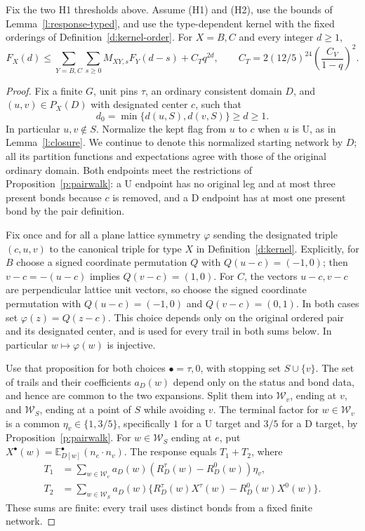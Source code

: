 \begin{lemma}\label{l:recineq}
Fix the two H1 thresholds above. Assume (H1) and (H2), use
the bounds of Lemma~\ref{l:response-typed}, and use the
type-dependent kernel with the fixed orderings of
Definition~\ref{d:kernel-order}.
For \(X=B,C\) and every integer \(d\ge1\),
\[
 F_X(d)\le\sum_{Y=B,C}\sum_{s\ge0}M_{XY,s}F_Y(d-s)+C_Tq^{2d},
 \qquad
 C_T=2(12/5)^{24}\left(\frac{C_V}{1-q}\right)^2 .
\]
\end{lemma}

\begin{proof}
Fix a finite \(G\), unit pins \(\tau\), an ordinary consistent
domain \(D\), and \((u,v)\in P_X(D)\) with designated center
\(c\), such that
\[
 d_0=\min\{d(u,S),d(v,S)\}\ge d\ge1.
\]
In particular \(u,v\notin S\).  Normalize the kept flag from
\(u\) to \(c\) when \(u\) is \(\mathrm U\), as in
Lemma~\ref{l:closure}.  We continue to denote this normalized
starting network by \(D\); all its partition functions and
expectations agree with those of the original ordinary domain.
Both endpoints meet the restrictions of Proposition~\ref{p:pairwalk}:
a \(\mathrm U\) endpoint has no original leg and at most three
present bonds because \(c\) is removed, and a \(\mathrm D\)
endpoint has at most one present bond by the pair definition.

Fix once and for all a plane lattice symmetry \(\varphi\) sending
the designated triple \((c,u,v)\) to the canonical triple for
type \(X\) in Definition~\ref{d:kernel}.  Explicitly, for \(B\)
choose a signed coordinate permutation \(Q\) with
\(Q(u-c)=(-1,0)\); then \(v-c=-(u-c)\) implies
\(Q(v-c)=(1,0)\).  For \(C\), the vectors \(u-c,v-c\) are
perpendicular lattice unit vectors, so choose the signed coordinate
permutation with \(Q(u-c)=(-1,0)\) and \(Q(v-c)=(0,1)\).
In both cases set \(\varphi(z)=Q(z-c)\).  This choice depends
only on the original ordered pair and its designated center,
and is used for every trail in both sums below.  In particular
\(w\mapsto\varphi(w)\) is injective.

Use that proposition for both choices \(\bullet=\tau,0\), with
stopping set \(S\cup\{v\}\).  The set of trails and their
coefficients \(a_D(w)\) depend only on the status and bond data,
and hence are common to the two expansions.  Split them into
\(\mathcal W_v\), ending at \(v\), and \(\mathcal W_S\),
ending at a point of \(S\) while avoiding \(v\).  The terminal
factor for \(w\in\mathcal W_v\) is a common
\(\eta_v\in\{1,3/5\}\), specifically \(1\) for a
\(\mathrm U\) target and \(3/5\) for a \(\mathrm D\) target,
by Proposition~\ref{p:pairwalk}.  For \(w\in\mathcal W_S\) ending
at \(e\), put
\(X^\bullet(w)=\mathbb E_{D[w]}^\bullet(n_e\cdot n_v)\).
The response equals \(T_1+T_2\), where
\begin{align*}
 T_1&=\sum_{w\in\mathcal W_v}a_D(w)
                 (R_D^\tau(w)-R_D^0(w))\eta_v,\\
 T_2&=\sum_{w\in\mathcal W_S}a_D(w)
              \{R_D^\tau(w)X^\tau(w)-R_D^0(w)X^0(w)\}.
\end{align*}
These sums are finite: every trail uses distinct bonds from a
fixed finite network.


\end{proof}
